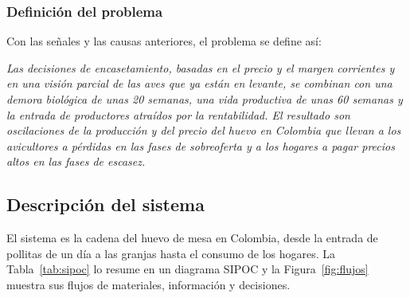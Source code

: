 \documentclass[preprint,12pt,authoryear]{elsarticle}
\begin{document}
\subsubsection{Definición del problema}

\noindent Con las señales y las causas anteriores, el problema se define así:

\medskip
\noindent \textit{Las decisiones de encasetamiento, basadas en el precio y el margen corrientes y en una visión parcial de las aves que ya están en levante, se combinan con una demora biológica de unas 20 semanas, una vida productiva de unas 60 semanas y la entrada de productores atraídos por la rentabilidad. El resultado son oscilaciones de la producción y del precio del huevo en Colombia que llevan a los avicultores a pérdidas en las fases de sobreoferta y a los hogares a pagar precios altos en las fases de escasez.}

\subsection{Descripción del sistema}
\label{sec3.3}

El sistema es la cadena del huevo de mesa en Colombia, desde la entrada de pollitas de un día a las granjas hasta el consumo de los hogares. La Tabla~\ref{tab:sipoc} lo resume en un diagrama SIPOC y la Figura~\ref{fig:flujos} muestra sus flujos de materiales, información y decisiones.
\end{document}
